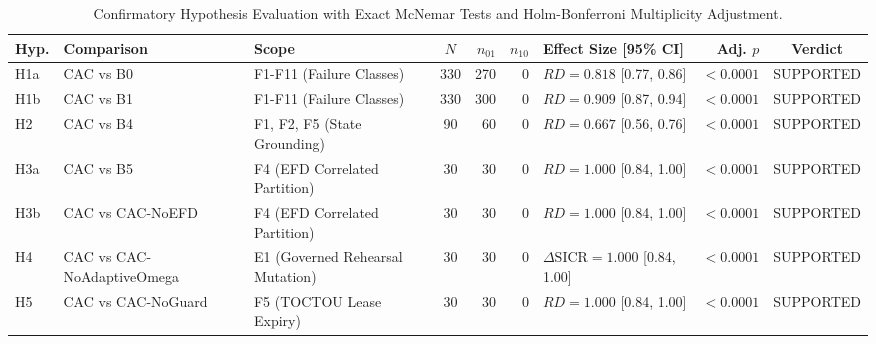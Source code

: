 \begin{table}[t]
\centering
\small
\setlength{\tabcolsep}{4.5pt}
\caption{Confirmatory Hypothesis Evaluation with Exact McNemar Tests and Holm-Bonferroni Multiplicity Adjustment.}
\label{tab:hypotheses}
\begin{tabularx}{\textwidth}{llXcrrlrc}
\toprule
\textbf{Hyp.} & \textbf{Comparison} & \textbf{Scope} & $N$ & $n_{01}$ & $n_{10}$ & \textbf{Effect Size [95\% CI]} & \textbf{Adj. $p$} & \textbf{Verdict} \\
\midrule
H1a & CAC vs B0 & F1-F11 (Failure Classes) & 330 & 270 & 0 & $RD=0.818$ [0.77, 0.86] & $<0.0001$ & \textsc{SUPPORTED} \\
H1b & CAC vs B1 & F1-F11 (Failure Classes) & 330 & 300 & 0 & $RD=0.909$ [0.87, 0.94] & $<0.0001$ & \textsc{SUPPORTED} \\
H2 & CAC vs B4 & F1, F2, F5 (State Grounding) & 90 & 60 & 0 & $RD=0.667$ [0.56, 0.76] & $<0.0001$ & \textsc{SUPPORTED} \\
H3a & CAC vs B5 & F4 (EFD Correlated Partition) & 30 & 30 & 0 & $RD=1.000$ [0.84, 1.00] & $<0.0001$ & \textsc{SUPPORTED} \\
H3b & CAC vs CAC-NoEFD & F4 (EFD Correlated Partition) & 30 & 30 & 0 & $RD=1.000$ [0.84, 1.00] & $<0.0001$ & \textsc{SUPPORTED} \\
H4 & CAC vs CAC-NoAdaptiveOmega & E1 (Governed Rehearsal Mutation) & 30 & 30 & 0 & $\Delta\text{SICR}=1.000$ [0.84, 1.00] & $<0.0001$ & \textsc{SUPPORTED} \\
H5 & CAC vs CAC-NoGuard & F5 (TOCTOU Lease Expiry) & 30 & 30 & 0 & $RD=1.000$ [0.84, 1.00] & $<0.0001$ & \textsc{SUPPORTED} \\
\bottomrule
\end{tabularx}
\end{table}

